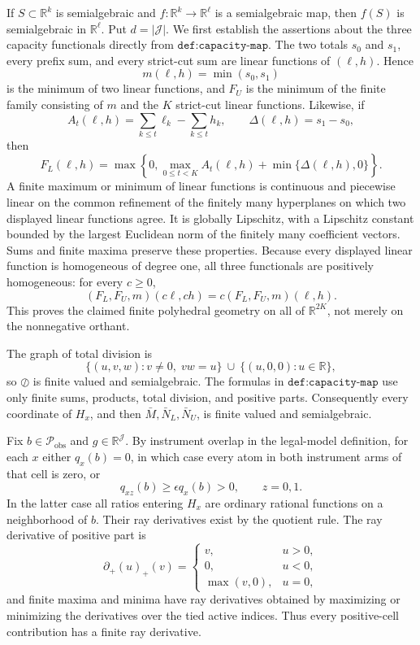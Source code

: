 If \(S\subset\mathbb R^k\) is semialgebraic and \(f:\mathbb R^k\to\mathbb R^\ell\) is a semialgebraic map, then \(f(S)\) is semialgebraic in \(\mathbb R^\ell\).
Put \(d=|\mathcal J|\).  We first establish the assertions about the three capacity functionals directly from \(\texttt{def:capacity-map}\).  The two totals \(s_0\) and \(s_1\), every prefix sum, and every strict-cut sum are linear functions of \((\ell,h)\).  Hence
\[
m(\ell,h)=\min(s_0,s_1)
\]
is the minimum of two linear functions, and \(F_U\) is the minimum of the finite family consisting of \(m\) and the \(K\) strict-cut linear functions.  Likewise, if
\[
A_t(\ell,h)=\sum_{k\le t}\ell_k-\sum_{k\le t}h_k,
\qquad \Delta(\ell,h)=s_1-s_0,
\]
then
\[
F_L(\ell,h)=\max\!\left\{0,\max_{0\le t<K}A_t(\ell,h)+\min\{\Delta(\ell,h),0\}\right\}.
\]
A finite maximum or minimum of linear functions is continuous and piecewise linear on the common refinement of the finitely many hyperplanes on which two displayed linear functions agree.  It is globally Lipschitz, with a Lipschitz constant bounded by the largest Euclidean norm of the finitely many coefficient vectors.  Sums and finite maxima preserve these properties.  Because every displayed linear function is homogeneous of degree one, all three functionals are positively homogeneous: for every \(c\ge0\),
\[
(F_L,F_U,m)(c\ell,ch)=c(F_L,F_U,m)(\ell,h).
\]
This proves the claimed finite polyhedral geometry on all of \(\mathbb R^{2K}\), not merely on the nonnegative orthant.

The graph of total division is
\[
\{(u,v,w):v\ne0,\;vw=u\}\ \cup\ \{(u,0,0):u\in\mathbb R\},
\]
so \(\oslash\) is finite valued and semialgebraic.  The formulas in \(\texttt{def:capacity-map}\) use only finite sums, products, total division, and positive parts.  Consequently every coordinate of \(H_x\), and then \(\bar M,\bar N_L,\bar N_U\), is finite valued and semialgebraic.

Fix \(b\in\mathcal P_{\mathrm{obs}}\) and \(g\in\mathbb R^{\mathcal J}\).  By instrument overlap in the legal-model definition, for each \(x\) either \(q_x(b)=0\), in which case every atom in both instrument arms of that cell is zero, or
\[
q_{xz}(b)\ge\epsilon q_x(b)>0,\qquad z=0,1.
\]
In the latter case all ratios entering \(H_x\) are ordinary rational functions on a neighborhood of \(b\).  Their ray derivatives exist by the quotient rule.  The ray derivative of positive part is
\[
\partial_+ (u)_+(v)=
\begin{cases}
v,&u>0,\\
0,&u<0,\\
\max(v,0),&u=0,
\end{cases}
\]
and finite maxima and minima have ray derivatives obtained by maximizing or minimizing the derivatives over the tied active indices.  Thus every positive-cell contribution has a finite ray derivative.

